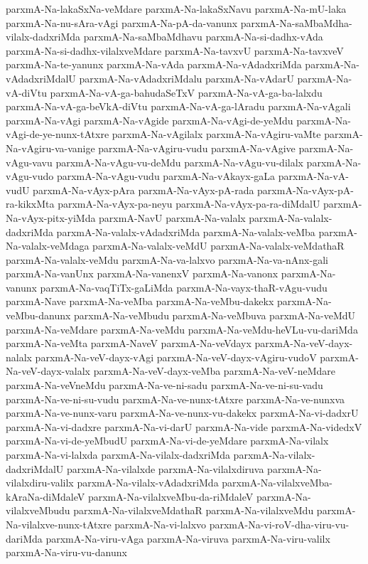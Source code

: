 {parxmA-Na-lakaSxNa-veMdare
parxmA-Na-lakaSxNavu
parxmA-Na-mU-laka
parxmA-Na-nu-sAra-vAgi
parxmA-Na-pA-da-vanunx
parxmA-Na-saMbaMdha-vilalx-dadxriMda
parxmA-Na-saMbaMdhavu
parxmA-Na-si-dadhx-vAda
parxmA-Na-si-dadhx-vilalxveMdare
parxmA-Na-tavxvU
parxmA-Na-tavxveV
parxmA-Na-te-yanunx
parxmA-Na-vAda
parxmA-Na-vAdadxriMda
parxmA-Na-vAdadxriMdalU
parxmA-Na-vAdadxriMdalu
parxmA-Na-vAdarU
parxmA-Na-vA-diVtu
parxmA-Na-vA-ga-bahudaSeTxV
parxmA-Na-vA-ga-ba-lalxdu
parxmA-Na-vA-ga-beVkA-diVtu
parxmA-Na-vA-ga-lAradu
parxmA-Na-vAgali
parxmA-Na-vAgi
parxmA-Na-vAgide
parxmA-Na-vAgi-de-yeMdu
parxmA-Na-vAgi-de-ye-nunx-tAtxre
parxmA-Na-vAgilalx
parxmA-Na-vAgiru-vaMte
parxmA-Na-vAgiru-va-vanige
parxmA-Na-vAgiru-vudu
parxmA-Na-vAgive
parxmA-Na-vAgu-vavu
parxmA-Na-vAgu-vu-deMdu
parxmA-Na-vAgu-vu-dilalx
parxmA-Na-vAgu-vudo
parxmA-Na-vAgu-vudu
parxmA-Na-vAkayx-gaLa
parxmA-Na-vA-vudU
parxmA-Na-vAyx-pAra
parxmA-Na-vAyx-pA-rada
parxmA-Na-vAyx-pA-ra-kikxMta
parxmA-Na-vAyx-pa-neyu
parxmA-Na-vAyx-pa-ra-diMdalU
parxmA-Na-vAyx-pitx-yiMda
parxmA-NavU
parxmA-Na-valalx
parxmA-Na-valalx-dadxriMda
parxmA-Na-valalx-vAdadxriMda
parxmA-Na-valalx-veMba
parxmA-Na-valalx-veMdaga
parxmA-Na-valalx-veMdU
parxmA-Na-valalx-veMdathaR
parxmA-Na-valalx-veMdu
parxmA-Na-va-lalxvo
parxmA-Na-va-nAnx-gali
parxmA-Na-vanUnx
parxmA-Na-vanenxV
parxmA-Na-vanonx
parxmA-Na-vanunx
parxmA-Na-vaqTiTx-gaLiMda
parxmA-Na-vayx-thaR-vAgu-vudu
parxmA-Nave
parxmA-Na-veMba
parxmA-Na-veMbu-dakekx
parxmA-Na-veMbu-danunx
parxmA-Na-veMbudu
parxmA-Na-veMbuva
parxmA-Na-veMdU
parxmA-Na-veMdare
parxmA-Na-veMdu
parxmA-Na-veMdu-heVLu-vu-dariMda
parxmA-Na-veMta
parxmA-NaveV
parxmA-Na-veVdayx
parxmA-Na-veV-dayx-nalalx
parxmA-Na-veV-dayx-vAgi
parxmA-Na-veV-dayx-vAgiru-vudoV
parxmA-Na-veV-dayx-valalx
parxmA-Na-veV-dayx-veMba
parxmA-Na-veV-neMdare
parxmA-Na-veVneMdu
parxmA-Na-ve-ni-sadu
parxmA-Na-ve-ni-su-vadu
parxmA-Na-ve-ni-su-vudu
parxmA-Na-ve-nunx-tAtxre
parxmA-Na-ve-nunxva
parxmA-Na-ve-nunx-varu
parxmA-Na-ve-nunx-vu-dakekx
parxmA-Na-vi-dadxrU
parxmA-Na-vi-dadxre
parxmA-Na-vi-darU
parxmA-Na-vide
parxmA-Na-videdxV
parxmA-Na-vi-de-yeMbudU
parxmA-Na-vi-de-yeMdare
parxmA-Na-vilalx
parxmA-Na-vi-lalxda
parxmA-Na-vilalx-dadxriMda
parxmA-Na-vilalx-dadxriMdalU
parxmA-Na-vilalxde
parxmA-Na-vilalxdiruva
parxmA-Na-vilalxdiru-valilx
parxmA-Na-vilalx-vAdadxriMda
parxmA-Na-vilalxveMba-kAraNa-diMdaleV
parxmA-Na-vilalxveMbu-da-riMdaleV
parxmA-Na-vilalxveMbudu
parxmA-Na-vilalxveMdathaR
parxmA-Na-vilalxveMdu
parxmA-Na-vilalxve-nunx-tAtxre
parxmA-Na-vi-lalxvo
parxmA-Na-vi-roV-dha-viru-vu-dariMda
parxmA-Na-viru-vAga
parxmA-Na-viruva
parxmA-Na-viru-valilx
parxmA-Na-viru-vu-danunx
}
